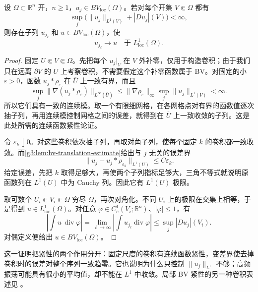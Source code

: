 \begin{theorem}\label{g3:thm:bv-local-compactness}
	设 \(\Omega\subset\mathbb R^n\) 开，\(n\ge1\)，\(u_j\in BV_{\mathrm{loc}}(\Omega)\)。若对每个开集 \(V\Subset\Omega\) 都有
	\[
		\sup_j\bigl(\|u_j\|_{L^1(V)}+|Du_j|(V)\bigr)<\infty,
	\]
	则存在子列 \(u_{j_\ell}\) 和 \(u\in BV_{\mathrm{loc}}(\Omega)\)，使
	\[
		u_{j_\ell}\longrightarrow u\quad\text{于 }L^1_{\mathrm{loc}}(\Omega).
	\]
\end{theorem}
\begin{proof}
	固定 \(U\Subset V\Subset\Omega\)。先把每个 \(u_j|_V\) 在 \(V\) 外补零，仅用于构造卷积；由于我们只在远离 \(\partial V\) 的 \(U\) 上考察卷积，不需要假定这个补零函数属于 BV。对固定的小 \(\varepsilon>0\)，函数 \(u_j*\rho_\varepsilon\) 在 \(\overline U\) 上一致有界，而且
	\[
		\sup_j\|\nabla(u_j*\rho_\varepsilon)\|_{L^\infty(\overline U)}
		\le \|\nabla\rho_\varepsilon\|_\infty
		\sup_j\|u_j\|_{L^1(V)}<\infty.
	\]
	所以它们具有一致的连续模。取一个有限细网格，在各网格点对有界的函数值逐次抽子列，再用连续模控制网格之间的误差，就得到在 \(\overline U\) 上一致收敛的子列。这是此处所需的连续函数紧性论证。

	令 \(\varepsilon_k\downarrow0\)。对这些卷积依次抽子列，再取对角子列，使每个固定 \(k\) 的卷积都一致收敛。而\cref{g3:lem:bv-translation-estimate}给出与 \(j\) 无关的误差界
	\[
		\|u_j-u_j*\rho_{\varepsilon_k}\|_{L^1(U)}
		\le C\varepsilon_k.
	\]
	给定误差，先把 \(k\) 取得足够大，再使两个子列指标足够大，三角不等式就说明原函数列在 \(L^1(U)\) 中为 Cauchy 列。因此它有 \(L^1(U)\) 极限。

	取可数个 \(U_i\Subset V_i\Subset\Omega\) 穷尽 \(\Omega\)，再次对角化。不同 \(U_i\) 上的极限在交集上相等，于是得到 \(u\in L^1_{\mathrm{loc}}(\Omega)\)。对任意 \(\varphi\in C_c^1(V_i;\mathbb R^n)\)、\(|\varphi|\le1\)，有
	\[
		\left|\int u\,\operatorname{div}\varphi\right|
		=\lim_{\ell\to\infty}
		\left|\int u_{j_\ell}\operatorname{div}\varphi\right|
		\le\sup_j|Du_j|(V_i).
	\]
	对偶定义便给出 \(u\in BV_{\mathrm{loc}}(\Omega)\)。
\end{proof}

这一证明把紧性的两个作用分开：固定尺度的卷积有连续函数紧性，变差界使去掉卷积时的误差对整个序列一致趋零。它也说明为什么只控制 \(\|u_j\|_{L^1}\) 不够；高频振荡可能具有很小的平均值，却不能在 \(L^1\) 中收敛。局部 BV 紧性的另一种卷积表述见 \cite[第6节，定理6.3，第37--38页]{Simon1983}。

